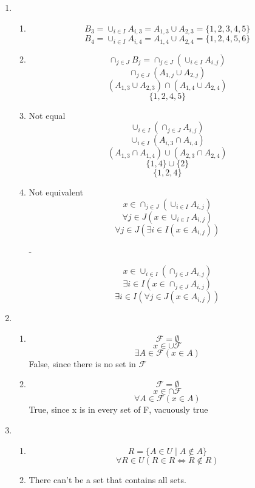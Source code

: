 \begin{enumerate}
    \item
    \begin{enumerate}
        \item 
        \[B_3 = \cup_{i \in I} A_{i,3} = A_{1,3} \cup A_{2,3} = \{1,2,3,4,5\}\]
        \[B_4 = \cup_{i \in I} A_{i,4} = A_{1,4} \cup A_{2,4} = \{1,2,4,5,6\}\]
        \item 
        \[\cap_{j \in J} B_j = \cap_{j \in J} (\cup_{i \in I} A_{i,j})\]
        \[\cap_{j \in J} (A_{1,j} \cup A_{2,j})\]
        \[(A_{1,3} \cup A_{2,3}) \cap (A_{1,4} \cup A_{2,4})\]
        \[\{1,2,4,5\}\]
        \item Not equal
        \[\cup_{i \in I}(\cap_{j \in J} A_{i,j})\]
        \[\cup_{i \in I}(A_{i,3} \cap A_{i,4})\]
        \[(A_{1,3} \cap A_{1,4}) \cup (A_{2,3} \cap A_{2,4})\]
        \[\{1,4\} \cup \{2\}\]
        \[\{1,2,4\}\]
        \item Not equivalent
        \[x \in \cap_{j \in J}(\cup_{i \in I} A_{i,j})\]
        \[\forall j \in J (x \in \cup_{i \in I} A_{i,j})\]
        \[\forall j \in J (\exists i \in I (x \in A_{i,j}))\]
        \begin{center}
            -
        \end{center}
        \[x \in \cup_{i \in I}(\cap_{j \in J} A_{i,j})\]
        \[\exists i \in I (x \in \cap_{j \in J} A_{i,j})\]
        \[\exists i \in I (\forall j \in J (x \in A_{i,j}))\]
    \end{enumerate}
    \item
    \begin{enumerate}
        \item 
        \[\mathscr{F} = \emptyset\]
        \[x \in \cup \mathscr{F}\]
        \[\exists A \in \mathscr{F} (x \in A)\]
        False, since there is no set in $\mathscr{F}$
        \item 
        \[\mathscr{F} = \emptyset\]
        \[x \in \cap \mathscr{F}\]
        \[\forall A \in \mathscr{F} (x \in A)\]
        True, since x is in every set of F, vacuously true
    \end{enumerate}
    \item
    \begin{enumerate}
        \item 
        \[R = \{A \in U \mid A \notin A\}\]
        \[\forall R \in U (R \in R \iff R \notin R)\]
        \item 
        There can't be a set that contains all sets.
    \end{enumerate}
\end{enumerate}
